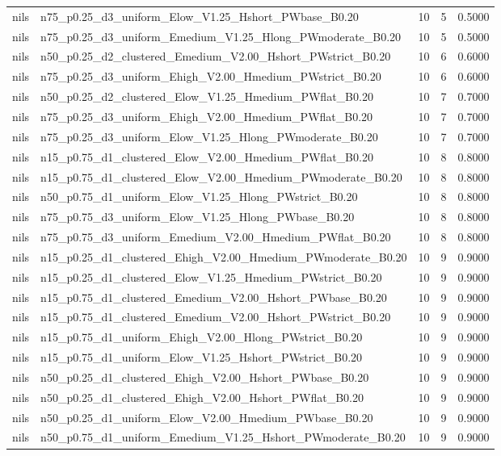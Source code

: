 \begin{tabular}{llrrr}
nils & n75_p0.25_d3_uniform_Elow_V1.25_Hshort_PWbase_B0.20 & 10 & 5 & 0.5000 \\
nils & n75_p0.25_d3_uniform_Emedium_V1.25_Hlong_PWmoderate_B0.20 & 10 & 5 & 0.5000 \\
nils & n50_p0.25_d2_clustered_Emedium_V2.00_Hshort_PWstrict_B0.20 & 10 & 6 & 0.6000 \\
nils & n75_p0.25_d3_uniform_Ehigh_V2.00_Hmedium_PWstrict_B0.20 & 10 & 6 & 0.6000 \\
nils & n50_p0.25_d2_clustered_Elow_V1.25_Hmedium_PWflat_B0.20 & 10 & 7 & 0.7000 \\
nils & n75_p0.25_d3_uniform_Ehigh_V2.00_Hmedium_PWflat_B0.20 & 10 & 7 & 0.7000 \\
nils & n75_p0.25_d3_uniform_Elow_V1.25_Hlong_PWmoderate_B0.20 & 10 & 7 & 0.7000 \\
nils & n15_p0.75_d1_clustered_Elow_V2.00_Hmedium_PWflat_B0.20 & 10 & 8 & 0.8000 \\
nils & n15_p0.75_d1_clustered_Elow_V2.00_Hmedium_PWmoderate_B0.20 & 10 & 8 & 0.8000 \\
nils & n50_p0.75_d1_uniform_Elow_V1.25_Hlong_PWstrict_B0.20 & 10 & 8 & 0.8000 \\
nils & n75_p0.75_d3_uniform_Elow_V1.25_Hlong_PWbase_B0.20 & 10 & 8 & 0.8000 \\
nils & n75_p0.75_d3_uniform_Emedium_V2.00_Hmedium_PWflat_B0.20 & 10 & 8 & 0.8000 \\
nils & n15_p0.25_d1_clustered_Ehigh_V2.00_Hmedium_PWmoderate_B0.20 & 10 & 9 & 0.9000 \\
nils & n15_p0.25_d1_clustered_Elow_V1.25_Hmedium_PWstrict_B0.20 & 10 & 9 & 0.9000 \\
nils & n15_p0.75_d1_clustered_Emedium_V2.00_Hshort_PWbase_B0.20 & 10 & 9 & 0.9000 \\
nils & n15_p0.75_d1_clustered_Emedium_V2.00_Hshort_PWstrict_B0.20 & 10 & 9 & 0.9000 \\
nils & n15_p0.75_d1_uniform_Ehigh_V2.00_Hlong_PWstrict_B0.20 & 10 & 9 & 0.9000 \\
nils & n15_p0.75_d1_uniform_Elow_V1.25_Hshort_PWstrict_B0.20 & 10 & 9 & 0.9000 \\
nils & n50_p0.25_d1_clustered_Ehigh_V2.00_Hshort_PWbase_B0.20 & 10 & 9 & 0.9000 \\
nils & n50_p0.25_d1_clustered_Ehigh_V2.00_Hshort_PWflat_B0.20 & 10 & 9 & 0.9000 \\
nils & n50_p0.25_d1_uniform_Elow_V2.00_Hmedium_PWbase_B0.20 & 10 & 9 & 0.9000 \\
nils & n50_p0.75_d1_uniform_Emedium_V1.25_Hshort_PWmoderate_B0.20 & 10 & 9 & 0.9000 \\

\end{tabular}
